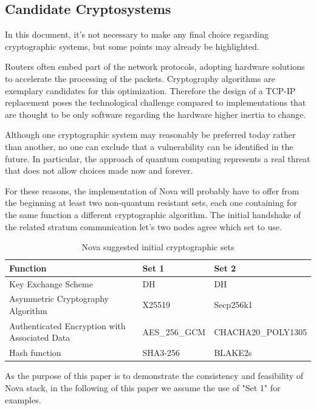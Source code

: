 \documentclass[12pt,oneside]{wlscirep}
\begin{document}
\subsection{Candidate Cryptosystems}
\label{annex:cryptoset}
In this document, it's not necessary to make any final choice regarding cryptographic systems, but some points may already be highlighted. \par
Routers often embed part of the network protocols, adopting hardware solutions to accelerate the processing of the packets. Cryptography algorithms are exemplary candidates for this optimization. Therefore the design of a TCP-IP replacement poses the technological challenge compared to implementations that are thought to be only software regarding the hardware higher inertia to change.\par
Although one cryptographic system may reasonably be preferred today rather than another, no one can exclude that a vulnerability can be identified in the future. In particular, the approach of quantum computing represents a real threat that does not allow choices made now and forever. \par 
For these reasons, the implementation of Nova will probably have to offer from the beginning at least two non-quantum resistant sets, each one containing for the same function a different cryptographic algorithm. The initial handshake of the related stratum communication let's two nodes agree which set to use.  \par 
\begin{table}[ht]
\centering
\begin{tabular}{|p{5cm}|p{5cm}|p{5cm}|} \hline
Function & Set 1 & Set 2 
 \\ \hline \hline
Key Exchange Scheme & DH & DH \\ \hline
Asymmetric Cryptography Algorithm & X25519 & Secp256k1 \\ \hline
Authenticated Encryption with Associated Data  & AES\_256\_GCM\cite{GCM} & CHACHA20\_POLY1305\cite{RFC7539}  \\ \hline
Hash function & SHA3-256 &  BLAKE2s \\ \hline
\end{tabular}
\caption{Nova suggested initial cryptographic sets}
\end{table}
As the purpose of this paper is to demonstrate the consistency and feasibility of Nova stack, in the following of this paper we assume the use of "Set 1" for examples.\par
\end{document}
